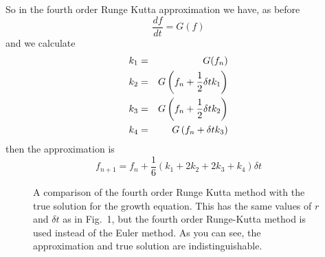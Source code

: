 \documentclass[12pt]{article}
\begin{document}
So in the fourth order Runge Kutta approximation we have, as before
\begin{equation}
\frac{df}{dt}=G(f)
\end{equation}
and we calculate
\begin{eqnarray}
k_1&=&G(f_n)\cr
k_2&=&G\left(f_n+\frac{1}{2}\delta tk_1\right)\cr 
k_3&=&G\left(f_n+\frac{1}{2}\delta tk_2\right)\cr 
k_4&=&G\left(f_n+\delta tk_3\right) 
\end{eqnarray}
then the approximation is
\begin{equation}
f_{n+1}=f_n+\frac{1}{6}(k_1+2k_2+2k_3+k_4)\delta t
\end{equation}

\begin{figure}
\begin{center}

\end{center}
\caption{A comparison of the fourth order Runge Kutta method with the
  true solution for the growth equation. This has the same values of
  $r$ and $\delta t$ as in Fig.~1, but the fourth order Runge-Kutta
  method is used instead of the Euler method. As you can see, the
  approximation and true solution are indistinguishable.}
\end{figure}
\end{document}
